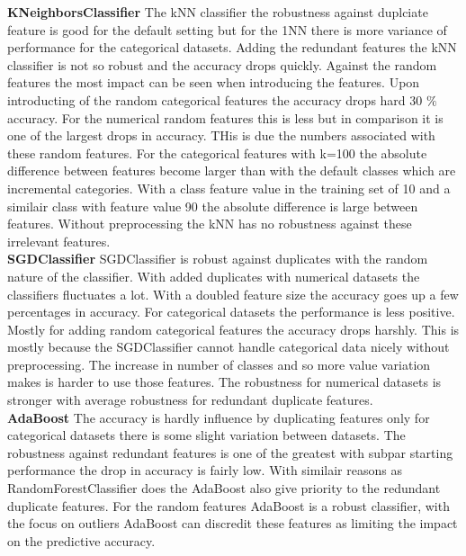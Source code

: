 \documentclass[a4paper,10pt]{article}
\begin{document}
\textbf{KNeighborsClassifier} The kNN classifier the robustness against duplciate feature is good for the default setting but for the 1NN there is more variance of performance for the categorical datasets. Adding the redundant features the kNN classifier is not so robust and the accuracy drops quickly. Against the random features the most impact can be seen when introducing the features. Upon introducting of the random categorical features the accuracy drops hard 30 $\%$ accuracy. For the numerical random features this is less but in comparison it is one of the largest drops in accuracy. THis is due the numbers associated with these random features. For the categorical features with k=100 the absolute difference between features become larger than with the default classes which are incremental categories. With a class feature value in the training set of 10 and a similair class with feature value 90 the absolute difference is large between features. Without preprocessing the kNN has no robustness against these irrelevant features. \\

\textbf{SGDClassifier} SGDClassifier is robust against duplicates with the random nature of the classifier. With added duplicates with numerical datasets the classifiers fluctuates a lot. With a doubled feature size the accuracy goes up a few percentages in accuracy. For categorical datasets the performance is less positive. Mostly for adding random categorical features the accuracy drops harshly. This is mostly because the SGDClassifier cannot handle categorical data nicely without preprocessing. The increase in number of classes and so more value variation makes is harder to use those features. The robustness for numerical datasets is stronger with average robustness for redundant duplicate features.  \\

\textbf{AdaBoost} The accuracy is hardly influence by duplicating features only for categorical datasets there is some slight variation between datasets. The robustness against redundant features is one of the greatest with subpar starting performance the drop in accuracy is fairly low. With similair reasons as RandomForestClassifier does the AdaBoost also give priority to the redundant duplicate features. For the random features AdaBoost is a robust classifier, with the focus on outliers AdaBoost can discredit these features as limiting the impact on the predictive accuracy. \\
\end{document}
